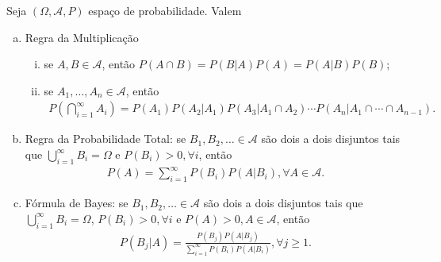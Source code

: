 \documentclass[../Notas.tex]{subfiles}
\begin{document}
\begin{proposition}
Seja $(\Omega, \mathcal{A}, P)$ espaço de probabilidade. Valem
\begin{enumerate}[(a)]
    \item Regra da Multiplicação
    \begin{enumerate}[(i)]
        \item se $A, B\in\mathcal{A}$, então $P(A\cap B) = P(B|A)P(A) = P(A|B)P(B)$;
        \item se $A_1, \dots, A_n\in\mathcal{A}$, então
        \begin{align*}
            P\left( \bigcap_{i=1}^{\infty} A_i \right) = P(A_1)P(A_2|A_1)P(A_3|A_1\cap A_2)\cdots P(A_n|A_1\cap\cdots\cap A_{n-1}).
        \end{align*}
    \end{enumerate}
    \item Regra da Probabilidade Total: se $B_1, B_2, \dots \in\mathcal{A}$ são dois a dois disjuntos tais que $\displaystyle{ \bigcup_{i=1}^{\infty}B_i = \Omega}$ e $P(B_i) > 0, \forall i$, então
    \begin{align*}
        P(A) = \sum_{i=1}^{\infty}P(B_i)P(A|B_i), \forall A\in\mathcal{A}.
    \end{align*}
    \item Fórmula de Bayes: se $B_1, B_2, \dots \in\mathcal{A}$ são dois a dois disjuntos tais que $\displaystyle{ \bigcup_{i=1}^{\infty}B_i = \Omega}$, $P(B_i) > 0, \forall i$ e $P(A) > 0, A\in\mathcal{A}$, então
    \begin{align*}
        P(B_j|A) = \frac{P(B_j)P(A|B_j)}{\sum_{i=1}^{\infty}P(B_i)P(A|B_i)}, \forall j\geq 1.
    \end{align*}
\end{enumerate}
\end{proposition}
\end{document}
